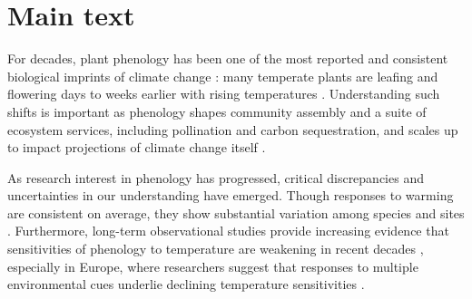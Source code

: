 \documentclass{article}
\begin{document}

\section* {Main text}

\par For decades, plant phenology has been one of the most reported and consistent biological imprints of climate change \emph{\citep{IPCC:2014sm}}: many temperate plants are leafing and flowering days to weeks earlier with rising temperatures \emph{\citep{millerrushing2008,menzel2006}}. Understanding such shifts is important as phenology shapes community assembly and a suite of ecosystem services, including pollination and carbon sequestration, and scales up to impact projections of climate change itself \emph{\citep{Cleland:2007or}}.
\par As research interest in phenology has progressed, critical discrepancies and uncertainties in our understanding have emerged. Though responses to warming are consistent on average, they show substantial variation among species and sites \emph{\citep{Wolkovich:2012n}}. Furthermore, long-term observational studies provide increasing evidence that sensitivities of phenology to temperature are weakening in recent decades \emph{\citep{Rutishauser:2008,yu2010}}, especially in Europe, where researchers suggest that responses to multiple environmental cues underlie declining temperature sensitivities \emph{\citep{fu2015}}.
\end{document}
